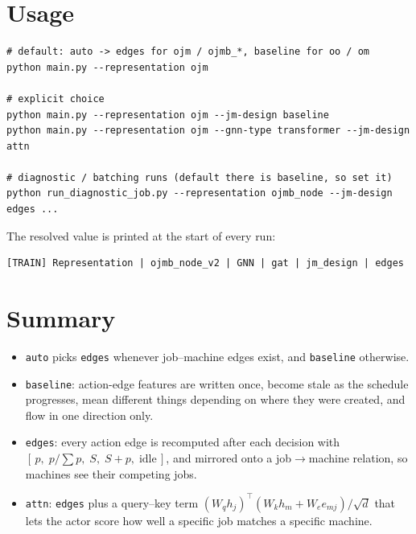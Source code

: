 \documentclass[11pt,a4paper]{article}
\newcommand{\code}[1]{\texttt{#1}}
\theoremstyle{remark}
\begin{document}
\section{Usage}

\begin{verbatim}
# default: auto -> edges for ojm / ojmb_*, baseline for oo / om
python main.py --representation ojm

# explicit choice
python main.py --representation ojm --jm-design baseline
python main.py --representation ojm --gnn-type transformer --jm-design attn

# diagnostic / batching runs (default there is baseline, so set it)
python run_diagnostic_job.py --representation ojmb_node --jm-design edges ...
\end{verbatim}

The resolved value is printed at the start of every run:
\begin{verbatim}
[TRAIN] Representation | ojmb_node_v2 | GNN | gat | jm_design | edges
\end{verbatim}

\section{Summary}
\begin{itemize}
  \item \code{auto} picks \code{edges} whenever job--machine edges exist, and
        \code{baseline} otherwise.
  \item \code{baseline}: action-edge features are written once, become stale as the schedule
        progresses, mean different things depending on where they were created, and flow
        in one direction only.
  \item \code{edges}: every action edge is recomputed after each decision with
        $[\,p,\; p/\!\sum p,\; S,\; S+p,\; \text{idle}\,]$, and mirrored onto a
        job$\to$machine relation, so machines see their competing jobs.
  \item \code{attn}: \code{edges} plus a query--key term
        $(W_q h_j)^\top(W_k h_m + W_e e_{mj})/\sqrt{d}$ that lets the actor score how well a
        specific job matches a specific machine.
\end{itemize}
\end{document}
